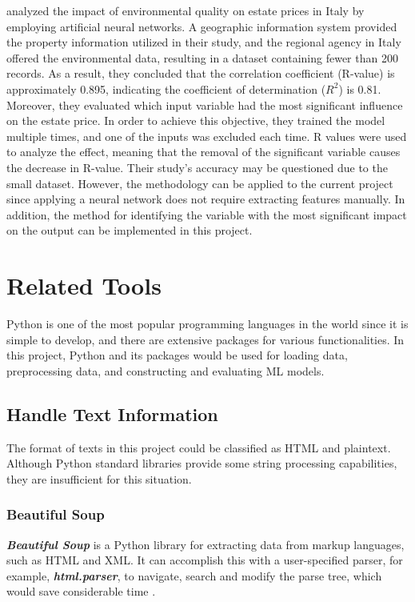 \documentclass[12pt,twoside]{report}
\begin{document}
\citet{RN37} analyzed the impact of environmental quality on estate prices in Italy by employing artificial neural networks. A geographic information system provided the property information utilized in their study, and the regional agency in Italy offered the environmental data, resulting in a dataset containing fewer than 200 records. As a result, they concluded that the correlation coefficient (R-value) is approximately 0.895, indicating the coefficient of determination ($R^2$) is 0.81. Moreover, they evaluated which input variable had the most significant influence on the estate price. In order to achieve this objective, they trained the model multiple times, and one of the inputs was excluded each time. R values were used to analyze the effect, meaning that the removal of the significant variable causes the decrease in R-value. Their study's accuracy may be questioned due to the small dataset. However, the methodology can be applied to the current project since applying a neural network does not require extracting features manually. In addition, the method for identifying the variable with the most significant impact on the output can be implemented in this project.

\section{Related Tools}
Python is one of the most popular programming languages in the world since it is simple to develop, and there are extensive packages for various functionalities. In this project, Python and its packages would be used for loading data, preprocessing data, and constructing and evaluating ML models. 

\subsection{Handle Text Information}
The format of texts in this project could be classified as HTML and plaintext. Although Python standard libraries provide some string processing capabilities, they are insufficient for this situation. 

\subsubsection{Beautiful Soup}
\textit{\textbf{Beautiful Soup}} is a Python library for extracting data from markup languages, such as HTML and XML. It can accomplish this with a user-specified parser, for example, \textbf{\textit{html.parser}}, to navigate, search and modify the parse tree, which would save considerable time \citep{RN10}. 
\end{document}
